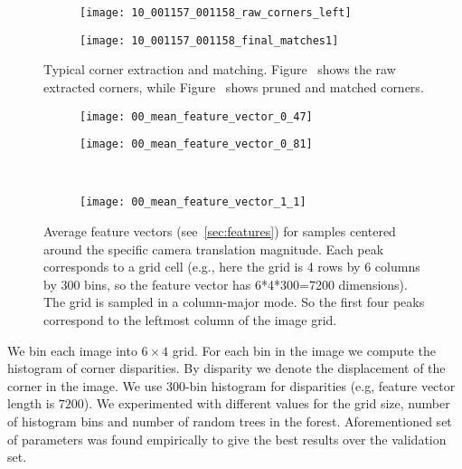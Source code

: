\begin{figure}[!ht]
  \centering
  \begin{subfigure}{.45\linewidth}
    \centering
    \texttt{[image: 10\_001157\_001158\_raw\_corners\_left]}
    \caption{}
    \label{fig:ex_corner_and_matching:corner}
  \end{subfigure}
  \begin{subfigure}{.45\linewidth}
    \texttt{[image: 10\_001157\_001158\_final\_matches1]}
    \caption{}
    \label{fig:ex_corner_and_matching:match}    
  \end{subfigure}
  \caption{Typical corner extraction and
    matching. Figure~ shows the raw
    extracted corners, while Figure~ shows
    pruned and matched corners.}
  \label{fig:ex_corner_and_matching}
\end{figure}

\begin{figure}[!ht]
  \centering
  \begin{subfigure}{.45\linewidth}
    \centering
    \texttt{[image: 00\_mean\_feature\_vector\_0\_47]}
    \caption{}\label{fig:1a}
  \end{subfigure}%
  \begin{subfigure}{.45\linewidth}
    \centering
    \texttt{[image: 00\_mean\_feature\_vector\_0\_81]}
    \caption{}\label{fig:1b}
  \end{subfigure}%
  \\
  \begin{subfigure}{\linewidth}
    \centering
    \texttt{[image: 00\_mean\_feature\_vector\_1\_1]}
    \caption{}\label{fig:1c}
  \end{subfigure}%
  \caption{Average feature vectors (see~\protect\ref{sec:features})
    for samples centered around the specific camera translation
    magnitude.  Each peak corresponds to a grid cell (e.g., here the
    grid is 4 rows by 6 columns by 300 bins, so the feature vector has
    6*4*300=7200 dimensions).  The grid is sampled in a column-major
    mode. So the first four peaks correspond to the leftmost column of
    the image grid.}
  \label{fig:feature_vectors}
\end{figure}

We bin each image into $6\times 4$ grid.  For each bin in the image we
compute the histogram of corner disparities.  By disparity we denote
the displacement of the corner in the image.  We use $300$-bin
histogram for disparities (e.g, feature vector length is $7200$).  We
experimented with different values for the grid size, number of
histogram bins and number of random trees in the forest.
Aforementioned set of parameters was found empirically to give the
best results over the validation set.


